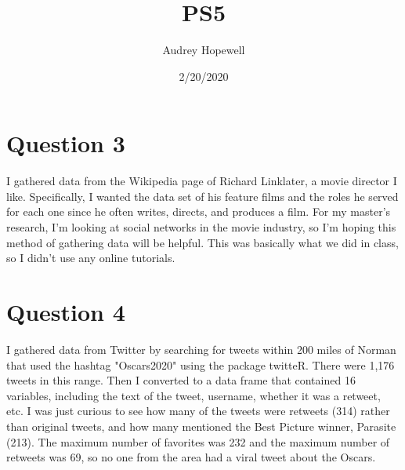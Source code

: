 \documentclass{article}
\title{PS5}
\author{Audrey Hopewell }
\date{2/20/2020}
\begin{document}
\maketitle

\section{Question 3}
I gathered data from the Wikipedia page of Richard Linklater, a movie director I like. Specifically, I wanted the data set of his feature films and the roles he served for each one since he often writes, directs, and produces a film. For my master's research, I'm looking at social networks in the movie industry, so I'm hoping this method of gathering data will be helpful. This was basically what we did in class, so I didn't use any online tutorials.

\section{Question 4}
I gathered data from Twitter by searching for tweets within 200 miles of Norman that used the hashtag "Oscars2020" using the package twitteR. There were 1,176 tweets in this range. Then I converted to a data frame that contained 16 variables, including the text of the tweet, username, whether it was a retweet, etc. I was just curious to see how many of the tweets were retweets (314) rather than original tweets, and how many mentioned the Best Picture winner, Parasite (213). The maximum number of favorites was 232 and the maximum number of retweets was 69, so no one from the area had a viral tweet about the Oscars.
\end{document}
